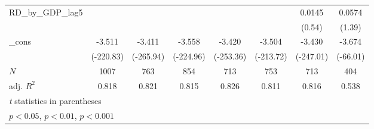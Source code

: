 {\begin{tabular}{l*{7}{c}}
\addlinespace
RD\_by\_GDP\_lag5&                  &                  &                  &                  &                  &   0.0145         &   0.0574         \\
          &                  &                  &                  &                  &                  &   (0.54)         &   (1.39)         \\
\addlinespace
\_cons    &   -3.511\sym{***}&   -3.411\sym{***}&   -3.558\sym{***}&   -3.420\sym{***}&   -3.504\sym{***}&   -3.430\sym{***}&   -3.674\sym{***}\\
          &(-220.83)         &(-265.94)         &(-224.96)         &(-253.36)         &(-213.72)         &(-247.01)         & (-66.01)         \\
\midrule
\(N\)     &     1007         &      763         &      854         &      713         &      753         &      713         &      404         \\
adj. \(R^{2}\)&    0.818         &    0.821         &    0.815         &    0.826         &    0.811         &    0.816         &    0.538         \\
\bottomrule
\multicolumn{8}{l}{\footnotesize \textit{t} statistics in parentheses}\\
\multicolumn{8}{l}{\footnotesize \sym{*} \(p<0.05\), \sym{**} \(p<0.01\), \sym{***} \(p<0.001\)}\\
\end{tabular}
}
